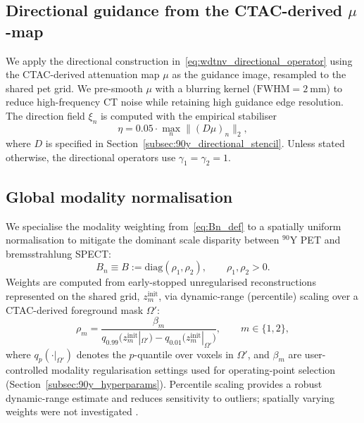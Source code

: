 \subsection{Directional guidance from the CTAC-derived $\mu$-map}
\label{subsec:90y_mu_guidance}

We apply the directional construction in~\eqref{eq:wdtnv_directional_operator} using the CTAC-derived attenuation map $\mu$ as the guidance image, resampled to the shared \gls{pet} grid. We pre-smooth $\mu$ with a blurring kernel ($\mathrm{FWHM}=\SI{2}{\milli\metre}$) to reduce high-frequency CT noise while retaining high guidance edge resolution. The direction field $\xi_n$ is computed with the empirical stabiliser
\begin{equation}
\eta = 0.05\cdot \max_{n}\|(D\mu)_n\|_2,
\label{eq:90y_xi_def}
\end{equation}
where $D$ is specified in Section~\ref{subsec:90y_directional_stencil}. Unless stated otherwise, the directional operators use $\gamma_1=\gamma_2=1$.

\subsection{Global modality normalisation}
\label{subsec:90y_global_weights}

We specialise the modality weighting from~\eqref{eq:Bn_def} to a spatially uniform normalisation to mitigate the dominant scale disparity between $^{90}$Y PET and bremsstrahlung SPECT:
\begin{equation}
B_n \equiv B := \mathrm{diag}(\rho_1,\rho_2),
\qquad \rho_1,\rho_2>0.
\end{equation}
Weights are computed from early-stopped unregularised reconstructions represented on the shared grid, $z_m^{\mathrm{init}}$, via dynamic-range (percentile) scaling over a CTAC-derived foreground mask $\Omega'$:
\begin{equation}
\rho_m
=
\frac{\beta_m}{q_{0.99}\!\bigl(z_m^{\mathrm{init}}|_{\Omega'}\bigr)-q_{0.01}\!\bigl(z_m^{\mathrm{init}}|_{\Omega'}\bigr)},
\qquad m\in\{1,2\},
\label{eq:90y_rhom_def}
\end{equation}
where $q_p(\cdot|_{\Omega'})$ denotes the $p$-quantile over voxels in $\Omega'$, and $\beta_m$ are user-controlled modality regularisation settings used for operating-point selection (Section~\ref{subsec:90y_hyperparams}). Percentile scaling provides a robust dynamic-range estimate and reduces sensitivity to outliers; spatially varying weights were not investigated \cite{tsaiBenefitsUsingSpatiallyVariant2020}.

